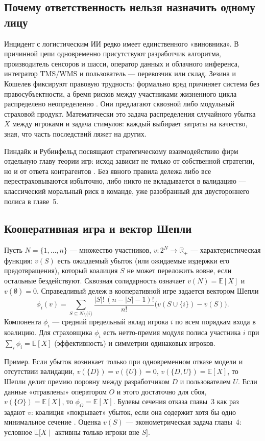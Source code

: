 \documentclass[a4paper,14pt]{extarticle}
\begin{document}
\subsection{Почему ответственность нельзя назначить одному лицу}

Инцидент с логистическим ИИ редко имеет единственного «виновника». В причинной цепи одновременно присутствуют разработчик алгоритма, производитель сенсоров и шасси, оператор данных и облачного инференса, интегратор TMS/WMS и пользователь --- перевозчик или склад. Зезина и Кошелев фиксируют правовую трудность: формально вред причиняет система без правосубъектности, а бремя рисков между участниками жизненного цикла распределено неопределенно \cite{zezina}. Они предлагают сквозной либо модульный страховой продукт. Математически это задача распределения случайного убытка $X$ между игроками и задача стимулов: каждый выбирает затраты на качество, зная, что часть последствий ляжет на других.

Пиндайк и Рубинфельд посвящают стратегическому взаимодействию фирм отдельную главу теории игр: исход зависит не только от собственной стратегии, но и от ответа контрагентов \cite{pindyck}. Без явного правила дележа либо все перестраховываются избыточно, либо никто не вкладывается в валидацию --- классический моральный риск в команде, уже разобранный для двустороннего полиса в главе~5.

\subsection{Кооперативная игра и вектор Шепли}

Пусть $N=\{1,\ldots,n\}$ --- множество участников, $v:2^N\to\mathbb{R}_+$ --- характеристическая функция: $v(S)$ есть ожидаемый убыток (или ожидаемые издержки его предотвращения), который коалиция $S$ не может переложить вовне, если остальные бездействуют. Сквозная солидарность означает $v(N)=\mathbb{E}[X]$ и $v(\emptyset)=0$. Справедливый дележ в кооперативной игре задается вектором Шепли
\begin{equation}
\phi_i(v)=\sum_{S\subseteq N\setminus\{i\}}
\frac{|S|!\,(n-|S|-1)!}{n!}\bigl(v(S\cup\{i\})-v(S)\bigr).
\label{eq:shapley}
\end{equation}
Компонента $\phi_i$ --- средний предельный вклад игрока $i$ по всем порядкам входа в коалицию. Для страховщика $\phi_i$ есть нетто-премия модуля полиса участника $i$ при $\sum_i\phi_i=\mathbb{E}[X]$ (эффективность) и симметрии одинаковых игроков.

Пример. Если убыток возникает только при одновременном отказе модели и отсутствии валидации, $v(\{D\})=v(\{U\})=0$, $v(\{D,U\})=\mathbb{E}[X]$, то Шепли делит премию поровну между разработчиком $D$ и пользователем $U$. Если данные «отравлены» оператором $O$ и этого достаточно для сбоя, $v(\{O\})=\mathbb{E}[X]$, то $\phi_O=\mathbb{E}[X]$. Булевы сечения отказа главы~3 как раз задают $v$: коалиция «покрывает» убыток, если она содержит хотя бы одно минимальное сечение \cite{yablonsky}. Оценка $v(S)$ --- эконометрическая задача главы~4: условное $\mathbb{E}[X\mid$ активны только игроки вне $S]$.
\end{document}
